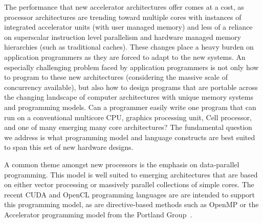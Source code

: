 

The performance that new accelerator architectures offer comes at a
cost, as processor architectures are trending toward multiple cores
with instances of integrated accelerator units (with user managed
memory) and less of a reliance on superscalar instruction level
parallelism and hardware managed memory hierarchies (such as
traditional caches).  These changes place a heavy burden on
application programmers as they are forced to adapt to the new
systems.  An especially challenging problem faced by application
programmers is not only how to program to these new architectures
(considering the massive scale of concurrency available), but also how
to design programs that are portable across the changing landscape of
computer architectures with unique memory systems and programming
models.  Can a programmer easily write one program that can run on a
conventional multicore CPU, graphics processing unit, Cell processor,
and one of many emerging many core architectures?  The fundamental
question we address is what programming model and language constructs
are best suited to span this set of new hardware designs.


A common theme amongst new processors is the emphasis on data-parallel
programming.  This model is well suited to emerging architectures that
are based on either vector processing or massively parallel
collections of simple cores.  The recent CUDA and OpenCL programming
languages are are intended to support this programming model, as are
directive-based methods such as OpenMP or the Accelerator programming
model from the Portland Group~\cite{pgi10accelerator}.

